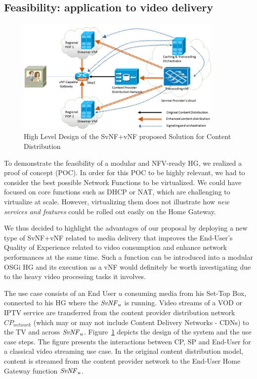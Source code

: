  
\subsection{Feasibility: application to video delivery}
\begin{figure}
	\center
	\includegraphics[width=0.90\textwidth,natwidth=8132,natheight=4335]{fig/highleveldesign.png}
	\caption{ High Level Design of the SvNF+vNF proposed Solution for Content Distribution
    \label{fig:hld}
    }
\end{figure}

To demonstrate the feasibility of a modular and NFV-ready HG, we realized a proof of concept (POC).
In order for this POC to be highly relevant, we had to consider the best possible Network Functions to be virtualized.
We could have focused on core functions such as DHCP or NAT, which are challenging to virtualize at scale. However, virtualizing them does not illustrate how \textit{new services and features} could be rolled out easily on the Home Gateway.

We thus decided to highlight the advantages of our proposal by deploying a new type of SvNF+vNF related to media delivery that improves the End-User's Quality of Experience related to video consumption and enhance network performances at the same time.
Such a function can be introduced into a modular OSGi HG and its execution as a vNF would definitely be worth investigating due to the heavy video processing tasks it involves.


The use case consists of an End User $u$ consuming media from his Set-Top Box, connected to his HG where the $\mathit{SvNF}_{u}$ is running.
Video streams of a VOD or IPTV service are transferred from the content provider distribution network \(\mathit{CP}_{\mathit{network}}\) (which may or may not include Content Delivery Networks - CDNs) to the TV and across $\mathit{SvNF}_{u}$.
Figure~\ref{fig:hld} depicts the design of the system and the use case steps. The figure presents the interactions between CP, SP and End-User for a classical video streaming use case.
In the original content distribution model, content is streamed from the content provider network to the End-User Home Gateway function \(\mathit{SvNF}_{u}\).


